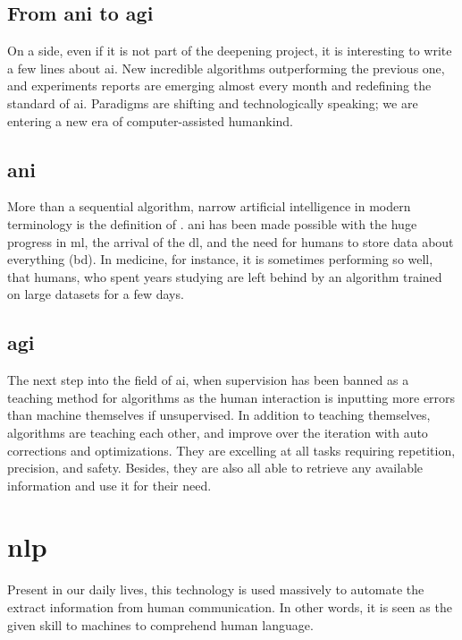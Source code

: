 \subsection{From \gls{ani} to \gls{agi}}
On a side, even if it is not part of the deepening project, it is interesting to write a few lines about \gls{ai}. New incredible algorithms outperforming the previous one, and experiments reports are emerging almost every month and redefining the standard of \gls{ai}. Paradigms are shifting and technologically speaking; we are entering a new era of computer-assisted humankind.

\subsection{\gls{ani}}
More than a sequential algorithm, narrow artificial intelligence in modern terminology is the definition of . \gls{ani} has been made possible with the huge progress in \gls{ml}, the arrival of the \gls{dl}, and the need for humans to store data about everything (\gls{bd}). In medicine, for instance, it is sometimes performing so well, that humans, who spent years studying are left behind by an algorithm trained on large datasets for a few days.

\subsection{\gls{agi}}
The next step into the field of \gls{ai}, when supervision has been banned as a teaching method for algorithms as the human interaction is inputting more errors than machine themselves if unsupervised. In addition to teaching themselves, algorithms are teaching each other, and improve over the iteration with auto corrections and optimizations. They are excelling at all tasks requiring repetition, precision, and safety. Besides, they are also all able to retrieve any available information and use it for their need. 


\section{\gls{nlp}}
Present in our daily lives, this technology is used massively to automate the extract information from human communication. In other words, it is seen as the given skill to machines to comprehend human language.

